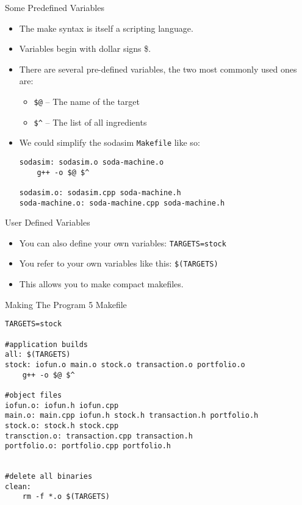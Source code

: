 \documentclass[]{beamer}
\begin{document}
\begin{frame}[fragile]{Some Predefined Variables}
\begin{itemize}[<+->]
    \item The make syntax is itself a scripting language.
    \item Variables begin with dollar signs \$.  
    \item There are several pre-defined variables, the two most
        commonly used ones are:
        \begin{itemize}
            \item \verb!$@! -- The name of the target
            \item \verb!$^! -- The list of all ingredients
        \end{itemize}
    \item We could simplify the sodasim \texttt{Makefile} like so:
\begin{adjustbox}{max width=\textwidth, max totalheight=0.9\textheight}
\begin{BVerbatim}
sodasim: sodasim.o soda-machine.o
    g++ -o $@ $^

sodasim.o: sodasim.cpp soda-machine.h
soda-machine.o: soda-machine.cpp soda-machine.h
\end{BVerbatim}
\end{adjustbox}
\end{itemize}
\end{frame}


\begin{frame}{User Defined Variables}
\begin{itemize}[<+->]
    \item You can also define your own variables:
        \newline \texttt{TARGETS=stock}
    \item You refer to your own variables like this:
        \newline  \texttt{\$(TARGETS)}
    \item This allows you to make compact makefiles.
\end{itemize}
\end{frame}

\begin{frame}[fragile]{Making The Program 5 Makefile}
\begin{adjustbox}{max width=\textwidth, max totalheight=0.9\textheight}
\begin{BVerbatim}
TARGETS=stock

#application builds
all: $(TARGETS)
stock: iofun.o main.o stock.o transaction.o portfolio.o
	g++ -o $@ $^

#object files
iofun.o: iofun.h iofun.cpp
main.o: main.cpp iofun.h stock.h transaction.h portfolio.h
stock.o: stock.h stock.cpp
transction.o: transaction.cpp transaction.h
portfolio.o: portfolio.cpp portfolio.h


#delete all binaries
clean:
	rm -f *.o $(TARGETS)
\end{BVerbatim}
\end{adjustbox}
\end{frame}
\end{document}
